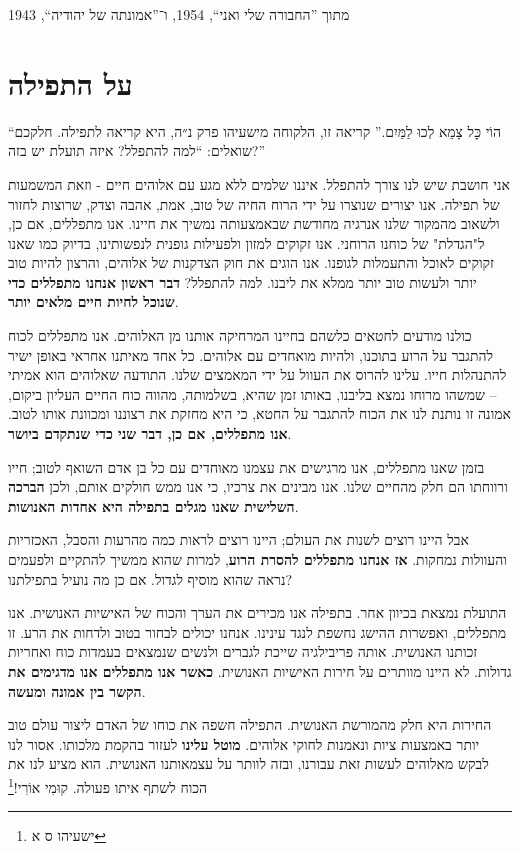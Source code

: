 \documentclass[14pt, article, extrafontsizes, twopage, a4paper]{memoir}
\newcommand{\attr}[1]{
{\raggedright\smaller#1}
}
\begin{document}
\attr{מתוך ”החבורה שלי ואני“, 1954, ו־”אמונתה של יהודיה“, 1943}

\chapter{על התפילה}

``הוֹי כׇּל צָמֵא לְכוּ לַמַּיִם.''
קריאה זו, הלקוחה מישעיהו פרק נ״ה, היא קריאה לתפילה. חלקכם שואלים: ``למה להתפלל? איזה תועלת יש בזה?''

אני חושבת שיש לנו צורך להתפלל. איננו שלמים ללא מגע עם אלוהים חיים - וזאת המשמעות של תפילה. אנו יצורים שנוצרו על ידי הרוח החיה של טוב, אמת, אהבה וצדק, שרוצות לחזור ולשאוב מהמקור שלנו אנרגיה מחודשת שבאמצעותה נמשיך את חיינו. אנו מתפללים, אם כן, ל"הגדלת" של כוחנו הרוחני. אנו זקוקים למזון ולפעילות גופנית לנפשותינו, בדיוק כמו שאנו זקוקים לאוכל והתעמלות לגופנו. אנו הוגים את חוק הצדקנות של אלוהים, והרצון להיות טוב יותר ולעשות טוב יותר ממלא את ליבנו. למה להתפלל? \textbf{דבר ראשון אנחנו מתפללים כדי שנוכל לחיות חיים מלאים יותר}.

כולנו מודעים לחטאים כלשהם בחיינו המרחיקה אותנו מן האלוהים. אנו מתפללים לכוח להתגבר על הרוע בתוכנו, ולהיות מואחדים עם אלוהים. כל אחד מאיתנו אחראי באופן ישיר להתנהלות חייו. עלינו להרוס את העוול על ידי המאמצים שלנו. התודעה שאלוהים הוא אמיתי -- שמשהו מרוחו נמצא בליבנו, באותו זמן שהיא, בשלמותה, מהווה כוח החיים העליון ביקום, אמונה זו נותנת לנו את הכוח להתגבר על החטא, כי היא מחזקת את רצוננו ומכוונת אותו לטוב. \textbf{אנו מתפללים, אם כן, דבר שני כדי שנתקדם ביושר}.

בזמן שאנו מתפללים, אנו מרגישים את עצמנו מאוחדים עם כל בן אדם השואף לטוב; חייו ורווחתו הם חלק מהחיים שלנו. אנו מבינים את צרכיו, כי אנו ממש חולקים אותם, ולכן \textbf{הברכה השלישית שאנו מגלים בתפילה היא אחדות האנושות}.

אבל היינו רוצים לשנות את העולם; היינו רוצים לראות כמה מהרעות והסבל, האכזריות והעוולות נמחקות. \textbf{אז אנחנו מתפללים להסרת הרוע}, למרות שהוא ממשיך להתקיים ולפעמים נראה שהוא מוסיף לגדול. אם כן מה נועיל בתפילתנו?

התועלת נמצאת בכיוון אחר. בתפילה אנו מכירים את הערך והכוח של האישיות האנושית. אנו מתפללים, ואפשרות ההישג נחשפת לנגד עינינו. אנחנו יכולים לבחור בטוב ולדחות את הרע. זו זכותנו האנושית. אותה פריבילגיה שייכת לגברים ולנשים שנמצאים בעמדות כוח ואחריות גדולות. לא היינו מוותרים על חירות האישיות האנושית. \textbf{כאשר אנו מתפללים אנו מדגימים את הקשר בין אמונה ומעשה}.

החירות היא חלק מהמורשת האנושית. התפילה חשפה את כוחו של האדם ליצור עולם טוב יותר באמצעות ציות ונאמנות לחוקי אלוהים. \textbf{מוטל עלינו} לעזור בהקמת מלכותו. אסור לנו לבקש מאלוהים לעשות זאת עבורנו, ובזה לוותר על עצמאותנו האנושית. הוא מציע לנו את הכוח לשתף איתו פעולה. קוּמִי אוֹרִי!\footnote{ישעיהו ס א}
\end{document}
